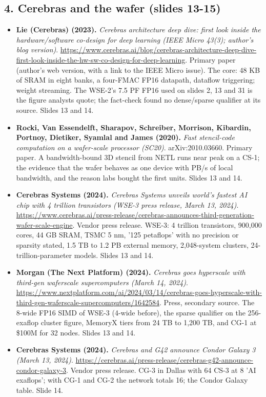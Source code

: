 \documentclass[11pt,letterpaper]{article}
\begin{document}
\subsection*{4. Cerebras and the wafer (slides 13-15)}
\begin{itemize}[leftmargin=1.2em,itemsep=3pt]\sloppy
\item \textbf{Lie (Cerebras) (2023).} \textit{Cerebras architecture deep dive: first look inside the hardware/software co-design for deep learning (IEEE Micro 43(3); author's blog version)}. \url{https://www.cerebras.ai/blog/cerebras-architecture-deep-dive-first-look-inside-the-hw-sw-co-design-for-deep-learning}. Primary paper (author's web version, with a link to the IEEE Micro issue). The core: 48 KB of SRAM in eight banks, a four-FMAC FP16 datapath, dataflow triggering; weight streaming. The WSE-2's 7.5 PF FP16 used on slides 2, 13 and 31 is the figure analysts quote; the fact-check found no dense/sparse qualifier at its source. Slides 13 and 14.
\item \textbf{Rocki, Van Essendelft, Sharapov, Schreiber, Morrison, Kibardin, Portnoy, Dietiker, Syamlal and James (2020).} \textit{Fast stencil-code computation on a wafer-scale processor (SC20)}. arXiv:2010.03660. Primary paper. A bandwidth-bound 3D stencil from NETL runs near peak on a CS-1; the evidence that the wafer behaves as one device with PB/s of local bandwidth, and the reason labs bought the first units. Slides 13 and 14.
\item \textbf{Cerebras Systems (2024).} \textit{Cerebras Systems unveils world's fastest AI chip with 4 trillion transistors (WSE-3 press release, March 13, 2024)}. \url{https://www.cerebras.ai/press-release/cerebras-announces-third-generation-wafer-scale-engine}. Vendor press release. WSE-3: 4 trillion transistors, 900,000 cores, 44 GB SRAM, TSMC 5 nm, '125 petaflops' with no precision or sparsity stated, 1.5 TB to 1.2 PB external memory, 2,048-system clusters, 24-trillion-parameter models. Slides 13 and 14.
\item \textbf{Morgan (The Next Platform) (2024).} \textit{Cerebras goes hyperscale with third-gen waferscale supercomputers (March 14, 2024)}. \url{https://www.nextplatform.com/ai/2024/03/14/cerebras-goes-hyperscale-with-third-gen-waferscale-supercomputers/1642584}. Press, secondary source. The 8-wide FP16 SIMD of WSE-3 (4-wide before), the sparse qualifier on the 256-exaflop cluster figure, MemoryX tiers from 24 TB to 1,200 TB, and CG-1 at \$100M for 32 nodes. Slides 13 and 14.
\item \textbf{Cerebras Systems (2024).} \textit{Cerebras and G42 announce Condor Galaxy 3 (March 13, 2024)}. \url{https://cerebras.ai/press-release/cerebras-g42-announce-condor-galaxy-3}. Vendor press release. CG-3 in Dallas with 64 CS-3 at 8 'AI exaflops'; with CG-1 and CG-2 the network totals 16; the Condor Galaxy table. Slide 14.

\end{itemize}
\end{document}
